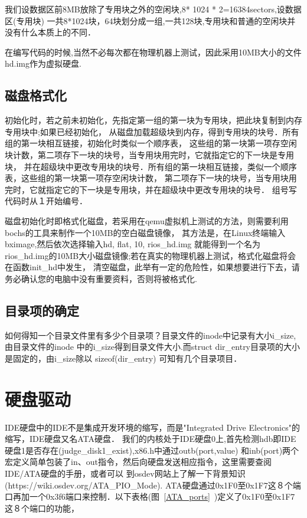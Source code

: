 我们设数据区前8MB放除了专用块之外的空闲块,8* 1024 * 2=16384sectors,设数据区(专用块)
一共8*1024块，64块划分成一组,一共128块,专用块和普通的空闲块并没有什么本质上的不同．

在编写代码的时候,当然不必每次都在物理机器上测试，因此采用10MB大小的文件hd.img作为虚拟硬盘.

\subsection{磁盘格式化}

初始化时，若之前未初始化，先指定第一组的第一块为专用块，把此块复制到内存专用块中;如果已经初始化，
从磁盘加载超级块到内存，得到专用块的块号．所有组的第一块相互链接，初始化时类似一个顺序表，
这些组的第一块第一项存空闲块计数，第二项存下一块的块号，当专用块用完时，它就指定它的下一块是专用块，
并在超级块中更改专用块的块号．所有组的第一块相互链接，类似一个顺序表，这些组的第一块第一项存空闲块计数，
第二项存下一块的块号，当专用块用完时，它就指定它的下一块是专用块，并在超级块中更改专用块的块号．
组号写代码时从１开始编号．

磁盘初始化时即格式化磁盘，若采用在qemu虚拟机上测试的方法，则需要利用bochs的工具来制作一个10MB的空白磁盘镜像，
其方法是，在Linux终端输入bximage,然后依次选择输入hd, flat, 10, rios\_hd.img
就能得到一个名为rios\_hd.img的10MB大小磁盘镜像;若在真实的物理机器上测试，格式化磁盘将会在函数init\_hd中发生，
清空磁盘，此举有一定的危险性，如果想要进行下去，请务必确认您的电脑中没有重要资料，否则将被格式化.

\subsection{目录项的确定}

如何得知一个目录文件里有多少个目录项？目录文件的inode中记录有大小i\_size,由目录文件的inode
中的i\_size得到目录文件大小.而struct dir\_entry目录项的大小是固定的，由i\_size除以 sizeof(dir\_entry)
可知有几个目录项目．


\section{硬盘驱动}
IDE硬盘中的IDE不是集成开发环境的缩写，而是"Integrated Drive Electronics"的缩写，IDE硬盘又名ATA硬盘．
我们的内核处于IDE硬盘0上,首先检测hdb即IDE硬盘1是否存在(judge\_disk1\_exist),x86.h中通过outb(port,value)
和inb(port)两个宏定义简单包装了in、out指令，然后向硬盘发送相应指令，这里需要查阅IDE/ATA硬盘的手册，或者可以
到osdev网站上了解一下背景知识(https://wiki.osdev.org/ATA\_PIO\_Mode).
ATA硬盘通过0x1F0至0x1F7这８个端口再加一个0x3f6端口来控制．以下表格(图~\ref{ATA_ports}~)定义了0x1F0至0x1F7这８个端口的功能，

